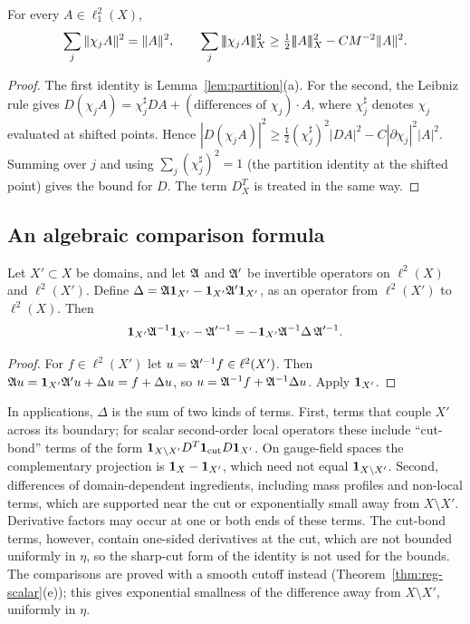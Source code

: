 \begin{lemma}\label{lem:local-norms}
For every $A\in\ell^2_1(X)$,
\[
\sum_j\|\chi_jA\|^2=\|A\|^2,\qquad \sum_j\tn{\chi_jA}_X^2\ge\tfrac12\tn A_X^2-CM^{-2}\|A\|^2 .
\]
\end{lemma}

\begin{proof}
The first identity is Lemma~\ref{lem:partition}(a). For the second, the Leibniz rule gives $D(\chi_jA)=\chi_j^{\sharp}DA+(\text{differences of }\chi_j)\cdot A$, where $\chi_j^\sharp$ denotes $\chi_j$ evaluated at shifted points. Hence $|D(\chi_jA)|^2\ge\frac12(\chi_j^\sharp)^2|DA|^2-C|\partial\chi_j|^2|A|^2$. Summing over $j$ and using $\sum_j(\chi_j^\sharp)^2=1$ (the partition identity at the shifted point) gives the bound for $D$. The term $D^T_X$ is treated in the same way.
\end{proof}

\subsection{An algebraic comparison formula}

\begin{lemma}\label{lem:compare-inverse}
Let $X'\subset X$ be domains, and let $\mathfrak A$ and $\mathfrak A'$ be invertible operators on $\ell^2(X)$ and $\ell^2(X')$. Define $\Delta=\mathfrak A\mathbf 1_{X'}-\mathbf 1_{X'}\mathfrak A'\mathbf 1_{X'}$, as an operator from $\ell^2(X')$ to $\ell^2(X)$. Then
\[
\mathbf 1_{X'}\mathfrak A^{-1}\mathbf 1_{X'}-\mathfrak A'^{-1}=-\mathbf 1_{X'}\mathfrak A^{-1}\Delta\,\mathfrak A'^{-1}.
\]
\end{lemma}

\begin{proof}
For $f\in\ell^2(X')$ let $u=\mathfrak A'^{-1}f\in\ell^2(X')$. Then $\mathfrak A u=\mathbf 1_{X'}\mathfrak A'u+\Delta u=f+\Delta u$, so $u=\mathfrak A^{-1}f+\mathfrak A^{-1}\Delta u$. Apply $\mathbf 1_{X'}$.
\end{proof}

In applications, $\Delta$ is the sum of two kinds of terms. First, terms that couple $X'$ across its boundary; for scalar second-order local operators these include ``cut-bond'' terms of the form $\mathbf 1_{X\setminus X'}D^T\mathbf 1_{\rm cut}D\mathbf 1_{X'}$. On gauge-field spaces the complementary projection is $\mathbf 1_X-\mathbf 1_{X'}$, which need not equal $\mathbf 1_{X\setminus X'}$. Second, differences of domain-dependent ingredients, including mass profiles and non-local terms, which are supported near the cut or exponentially small away from $X\setminus X'$. Derivative factors may occur at one or both ends of these terms. The cut-bond terms, however, contain one-sided derivatives at the cut, which are not bounded uniformly in $\eta$, so the sharp-cut form of the identity is not used for the bounds. The comparisons are proved with a smooth cutoff instead (Theorem~\ref{thm:reg-scalar}(e)); this gives exponential smallness of the difference away from $X\setminus X'$, uniformly in $\eta$.
